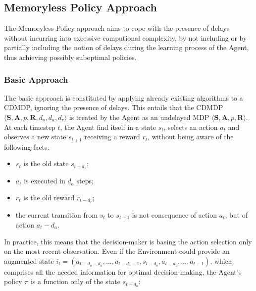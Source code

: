         \newpage
        \subsection{Memoryless Policy Approach}
            \label{subs:memorylessapproach}
            The Memoryless Policy approach aims to cope with the presence of delays without incurring into excessive computional complexity, by not including or by partially including the notion of delays during the learning process of the Agent, thus achieving possibly suboptimal policies.
            
            \subsubsection{Basic Approach}
                The basic approach is constituted by applying already existing algorithms to a CDMDP, ignoring the presence of delays. This entails that the CDMDP $\langle \mathbf{S}, \mathbf{A}, p, \mathbf{R}, d_o, d_a, d_r \rangle$ is treated by the Agent as an undelayed MDP $\langle \mathbf{S}, \mathbf{A}, p, \mathbf{R} \rangle$. At each timestep $t$, the Agent find itself in a state $s_t$, selects an action $a_t$ and observes a new state $s_{t+1}$ receiving a reward $r_t$, without being aware of the following facts:
                \begin{itemize}[topsep=0.5em, partopsep=0.5em]
                        \setlength\itemsep{0em}
                        \item $s_t$ is the old state $s_{t-d_o}$;
                        \item $a_t$ is executed in $d_a$ steps;
                        \item $r_t$ is the old reward $r_{t-d_r}$;
                        \item the current transition from $s_t$ to $s_{t+1}$ is not consequence of action $a_t$, but of action $a_t-d_a$.
                \end{itemize}
                \noindent
                In practice, this means that the decision-maker is basing the action selection only on the most recent observation. Even if the Environment could provide an augmented state $i_t = \left( a_{t-d_{o}-d_{a}}, ..., a_{t-d_{o}-1}, s_{t-d_{o}}, a_{t-d_{o}}, ..., a_{t-1} \right)$, which comprises all the needed information for optimal decision-making, the Agent's policy $\pi$ is a function only of the state $s_{t-d_{o}}$:
                
